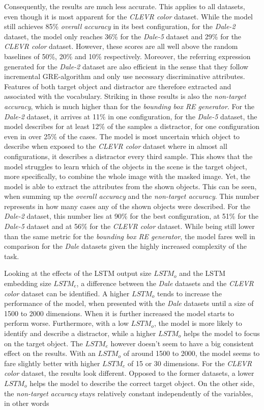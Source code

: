 Consequently, the results are much less accurate.
This applies to all datasets, even though it is most apparent for the \emph{CLEVR color} dataset.
While the model still achieves 85\% \emph{overall accuracy} in its best configuration, for the \emph{Dale-2} dataset, the model only reaches 36\% for the \emph{Dale-5} dataset and 29\% for the \emph{CLEVR color} dataset.
However, these scores are all well above the random baselines of 50\%, 20\% and 10\% respectively.
Moreover, the referring expression generated for the \emph{Dale-2} dataset are also efficient in the sense that they follow incremental GRE-algorithm and only use necessary discriminative attributes.
Features of both target object and distractor are therefore extracted and associated with the vocabulary.
Striking in these results is also the \emph{non-target accuracy}, which is much higher than for the \emph{bounding box RE generator}.
For the \emph{Dale-2} dataset, it arrives at 11\% in one configuration, for the \emph{Dale-5} dataset, the model describes for at least 12\% of the samples a distractor, for one configuration even in over 25\% of the cases.
The model is most uncertain which object to describe when exposed to the \emph{CLEVR color} dataset where in almost all configurations, it describes a distractor every third sample.
This shows that the model struggles to learn which of the objects in the scene is the target object, more specifically, to combine the whole image with the masked image.
Yet, the model is able to extract the attributes from the shown objects.
This can be seen, when summing up the \emph{overall accuracy} and the \emph{non-target accuracy}.
This number represents in how many cases any of the shown objects were described.
For the \emph{Dale-2} dataset, this number lies at 90\% for the best configuration, at 51\% for the \emph{Dale-5} dataset and at 56\% for the \emph{CLEVR color} dataset.
While being still lower than the same metric for the \emph{bounding box RE generator}, the model fares well in comparison for the \emph{Dale} datasets given the highly increased complexity of the task.

Looking at the effects of the LSTM output size $LSTM_o$ and the LSTM embedding size $LSTM_e$, a difference between the \emph{Dale} datasets and the \emph{CLEVR color} dataset can be identified.
A higher $LSTM_o$ tends to increase the performance of the model, when presented with the \emph{Dale} datasets until a size of 1500 to 2000 dimensions.
When it is further increased the model starts to perform worse.
Furthermore, with a low $LSTM_o$, the model is more likely to identify and describe a distractor, while a higher $LSTM_o$ helps the model to focus on the target object.
The $LSTM_e$ however doesn't seem to have a big consistent effect on the results. With an $LSTM_o$ of around 1500 to 2000, the model seems to fare slightly better with higher $LSTM_e$ of 15 or 30 dimensions.
For the \emph{CLEVR color} dataset, the results look different.
Opposed to the former datasets, a lower $LSTM_o$ helps the model to describe the correct target object.
On the other side, the \emph{non-target accuracy} stays relatively constant independently of the variables, in other words

